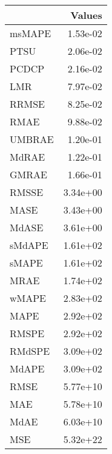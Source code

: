 \begin{tabular}{lr}
\toprule
 & Values \\
\midrule
msMAPE & 1.53e-02 \\
PTSU & 2.06e-02 \\
PCDCP & 2.16e-02 \\
LMR & 7.97e-02 \\
RRMSE & 8.25e-02 \\
RMAE & 9.88e-02 \\
UMBRAE & 1.20e-01 \\
MdRAE & 1.22e-01 \\
GMRAE & 1.66e-01 \\
RMSSE & 3.34e+00 \\
MASE & 3.43e+00 \\
MdASE & 3.61e+00 \\
sMdAPE & 1.61e+02 \\
sMAPE & 1.61e+02 \\
MRAE & 1.74e+02 \\
wMAPE & 2.83e+02 \\
MAPE & 2.92e+02 \\
RMSPE & 2.92e+02 \\
RMdSPE & 3.09e+02 \\
MdAPE & 3.09e+02 \\
RMSE & 5.77e+10 \\
MAE & 5.78e+10 \\
MdAE & 6.03e+10 \\
MSE & 5.32e+22 \\
\bottomrule
\end{tabular}
